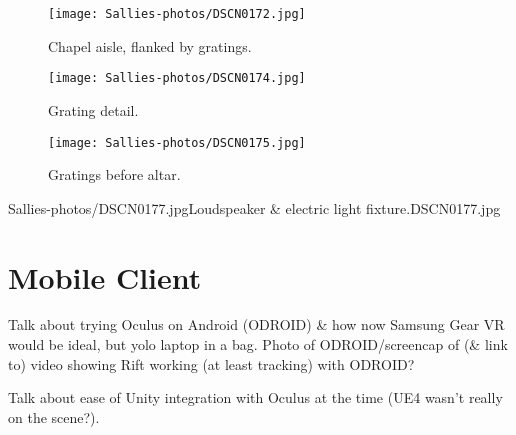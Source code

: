 \begin{figure}[h]
    \begin{center}
    \begin{minipage}{.32\textwidth}
        \begin{center}
        \texttt{[image: Sallies-photos/DSCN0172.jpg]}
        \caption{Chapel aisle, flanked by gratings.}
        \label{DSCN0172.jpg}
        \end{center}
    \end{minipage}%
    \hspace{.01\textwidth}
    \begin{minipage}{.32\textwidth}
		\begin{center}
        \texttt{[image: Sallies-photos/DSCN0174.jpg]}
        \caption{Grating detail.}
        \label{DSCN0174.jpg}
        \end{center}
    \end{minipage}%
    \hspace{.01\textwidth}
    \begin{minipage}{.32\textwidth}
        \begin{center}
        \texttt{[image: Sallies-photos/DSCN0175.jpg]}
        \caption{Gratings before altar.}
        \label{DSCN0175.jpg}
        \end{center}
    \end{minipage}
    \end{center}
\end{figure}

       {Sallies-photos/DSCN0177.jpg}{Loudspeaker \& electric light fixture.}{DSCN0177.jpg}


\section{Mobile Client}

Talk about trying Oculus on Android (ODROID) \& how now Samsung Gear VR would be ideal, but yolo laptop in a bag. Photo of ODROID/screencap of (\& link to) video showing Rift working (at least tracking) with ODROID?

Talk about ease of Unity integration with Oculus at the time (UE4 wasn't really on the scene?).


